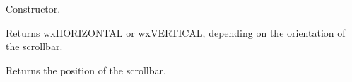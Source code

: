 
Constructor.

\label{wxscrollwineventgetorientation}


Returns wxHORIZONTAL or wxVERTICAL, depending on the orientation of the scrollbar.

\label{wxscrollwineventgetposition}


Returns the position of the scrollbar.

